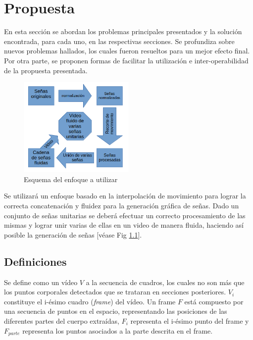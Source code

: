 \chapter{Propuesta}\label{chapter:proposal}
En esta sección se abordan los problemas principales presentados y la solución encontrada, para cada uno, en las respectivas secciones. Se profundiza sobre nuevos problemas hallados, los cuales fueron resueltos para un mejor efecto final. Por otra parte, se proponen formas de facilitar la utilización e inter-operabilidad de la propuesta presentada. 


\begin{figure}[ht!]
\centering
\includegraphics[width=0.5\textwidth]{./Graphics/esquema}
\caption{Esquema del enfoque a utilizar}
\label{f:enfoque_esquema}
\end{figure}

Se utilizará un enfoque basado en la interpolación de movimiento para lograr la correcta concatenación y fluidez para la generación gráfica de señas. Dado un conjunto de señas unitarias se deberá efectuar un correcto procesamiento de las mismas y lograr unir varias de ellas en un video de manera fluida, haciendo así posible la generación de señas [véase Fig \ref{f:enfoque_esquema}]. 



\section{Definiciones}

Se define como un vídeo $V$ a la secuencia de cuadros, los cuales no son más que los puntos corporales detectados que se trataran en secciones posteriores. $V_i$
constituye el i-ésimo cuadro (\emph{frame}) del vídeo. Un frame $F$ está compuesto por una secuencia
de puntos en el espacio, representando las posiciones de las diferentes partes del cuerpo extraídas,
$F_i$ representa el i-ésimo punto del frame y $F_{parte}$ representa los puntos asociados a la parte 
descrita en el frame. 

